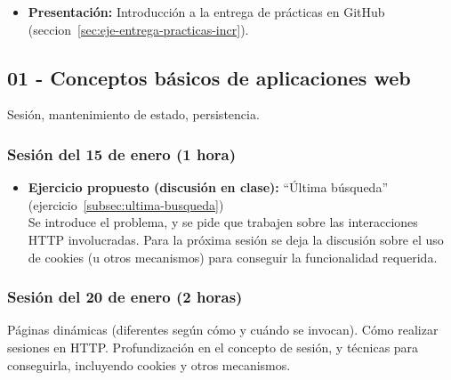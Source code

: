 \documentclass[a4paper,12pt]{article}
\begin{document}
\begin{itemize}
\item \textbf{Presentación:} Introducción a la entrega de prácticas en GitHub (seccion~\ref{sec:eje-entrega-practicas-incr}).
\end{itemize}
  
\subsection{01 - Conceptos básicos de aplicaciones web}

Sesión, mantenimiento de estado, persistencia.

\subsubsection{Sesión del 15 de enero (1 hora)}

\begin{itemize}
\item \textbf{Ejercicio propuesto (discusión en clase):} ``Última búsqueda'' (ejercicio~\ref{subsec:ultima-busqueda}) \\
  Se introduce el problema, y se pide que trabajen sobre las interacciones HTTP involucradas. Para la próxima sesión se deja la discusión sobre el uso de cookies (u otros mecanismos) para conseguir la funcionalidad requerida.
\end{itemize}

\subsubsection{Sesión del 20 de enero (2 horas)}

Páginas dinámicas (diferentes según cómo y cuándo se invocan). Cómo realizar sesiones en HTTP. Profundización en el concepto de sesión, y técnicas para conseguirla, incluyendo cookies y otros mecanismos.
\end{document}
